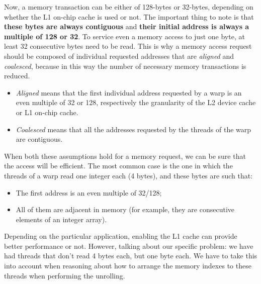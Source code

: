\documentclass[12pt]{extarticle}
\begin{document}
Now, a memory transaction can be either of 128-bytes or 32-bytes, depending on whether the L1 on-chip cache is used or not. The important thing to note is that \textbf{these bytes are always contiguous} and \textbf{their initial address is always a multiple of 128 or 32}. To service even a memory access to just one byte, at least 32 consecutive bytes need to be read. This is why a memory access request should be composed of individual requested addresses that are \emph{aligned} and \emph{coalesced}, because in this way the number of necessary memory transactions is reduced. 
\begin{itemize}
    \item \emph{Aligned} means that the first individual address requested by a warp is an even multiple of 32 or 128, respectively the granularity of the L2 device cache or L1 on-chip cache.
    \item \emph{Coalesced} means that all the addresses requested by the threads of the warp are contiguous.
\end{itemize}
When both these assumptions hold for a memory request, we can be sure that the access will be efficient. The most common case is the one in which the threads of a warp read one integer each (4 bytes), and these bytes are such that:
\begin{itemize}
    \item The first address is an even multiple of 32/128;
    \item All of them are adjacent in memory (for example, they are consecutive elements of an integer array).
\end{itemize}
Depending on the particular application, enabling the L1 cache can provide better performance or not. However, talking about our specific problem: we have had threads that don't read 4 bytes each, but one byte each. We have to take this into account when reasoning about how to arrange the memory indexes to these threads when performing the unrolling.
\end{document}
